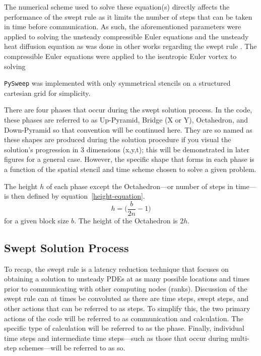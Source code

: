 \documentclass[review]{elsarticle}
\def\pysweep{\texttt{PySweep}}
\begin{document}
\par
The numerical scheme used to solve these equation(s) directly affects the performance of the swept rule as it limits the number of steps that can be taken in time before communication.
As such, the aforementioned parameters were applied to solving the unsteady compressible Euler equations and the unsteady heat diffusion equation as was done in other works regarding the swept rule \cite{Magee2018AcceleratingDecomposition,Alhubail2016ThePDEs,Alhubail2018ThePDEs, MYPAPERHERE}. The compressible Euler equations were applied to the isentropic Euler vortex to solving 

\pysweep{} was implemented with only symmetrical stencils on a structured cartesian grid for simplicity.

\par
There are four phases that occur during the swept solution process. In the code, these phases are referred to as Up-Pyramid, Bridge (X or Y), Octahedron, and Down-Pyramid so that convention will be continued here. They are so named as these shapes are produced during the solution procedure if you visual the solution's progression in 3 dimensions (x,y,t); this will be demonstrated in later figures for a general case. However, the specific shape that forms in each phase is a function of the spatial stencil and time scheme chosen to solve a given problem.  

The height $h$ of each phase except the Octahedron---or number of steps in time---is then defined by equation~\ref{height-equation}.
\begin{equation}
  \label{height-equation}
    h = \bigg(\frac{b}{2n}-1\bigg)
\end{equation}
for a given block size $b$. The height of the Octahedron is $2h$.


\subsection{Swept Solution Process}
\par
To recap, the swept rule is a latency reduction technique that focuses on obtaining a solution to unsteady PDEs at as many possible locations and times prior to communicating with other computing nodes (ranks). Discussion of the swept rule can at times be convoluted as there are time steps, swept steps, and other actions that can be referred to as steps. To simplify this, the two primary actions of the code will be referred to as communication and calculation. The specific type of calculation will be referred to as the phase. Finally, individual time steps and intermediate time steps---such as those that occur during multi-step schemes---will be referred to as so. 
\end{document}
